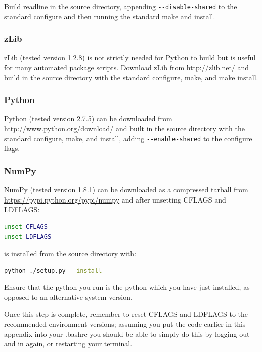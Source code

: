 Build readline in the source directory, appending
\lstinline[language=bash]+--disable-shared+ to the standard configure and then
running the standard make and install.

\subsubsection{zLib}
\label{sec:required_libraries_python_zlib}

zLib (tested version 1.2.8) is not strictly needed for Python to build but is
useful for many automated package scripts. Download zLib from
\url{http://zlib.net/} and build in the source directory with the standard
configure, make, and make install.

\subsubsection{Python}
\label{sec:required_libraries_python_python}

Python (tested version 2.7.5) can be downloaded from
\url{http://www.python.org/download/} and built in the source directory with
the standard configure, make, and install, adding
\lstinline[language=bash]+--enable-shared+ to the configure flags.

\subsubsection{NumPy}
\label{sec:required_libraries_python_numpy}

NumPy (tested version 1.8.1) can be downloaded as a compressed tarball from
\url{https://pypi.python.org/pypi/numpy} and after unsetting CFLAGS and
LDFLAGS:

\begin{lstlisting}[language=bash]
unset CFLAGS
unset LDFLAGS
\end{lstlisting}

is installed from the source directory with:

\begin{lstlisting}[language=bash]
python ./setup.py --install
\end{lstlisting}

Ensure that the python you run is the python which you have just installed, as
opposed to an alternative system version.

Once this step is complete, remember to reset CFLAGS and LDFLAGS to the
recommended environment versions; assuming you put the code earlier in this
appendix into your .bashrc you should be able to simply do this by logging out
and in again, or restarting your terminal.

